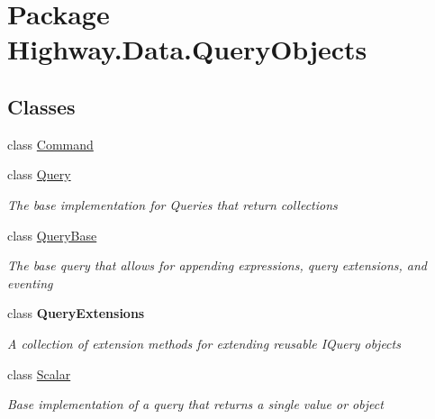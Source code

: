 \hypertarget{namespace_highway_1_1_data_1_1_query_objects}{\section{Package Highway.\-Data.\-Query\-Objects}
\label{namespace_highway_1_1_data_1_1_query_objects}
}
\subsection*{Classes}
\begin{DoxyCompactItemize}
\item 
class \hyperlink{class_highway_1_1_data_1_1_query_objects_1_1_command}{Command}
\begin{DoxyCompactList}\small\item\em \end{DoxyCompactList}\item 
class \hyperlink{class_highway_1_1_data_1_1_query_objects_1_1_query-g}{Query}
\begin{DoxyCompactList}\small\item\em The base implementation for Queries that return collections \end{DoxyCompactList}\item 
class \hyperlink{class_highway_1_1_data_1_1_query_objects_1_1_query_base}{Query\-Base}
\begin{DoxyCompactList}\small\item\em The base query that allows for appending expressions, query extensions, and eventing \end{DoxyCompactList}\item 
class {\bfseries Query\-Extensions}
\begin{DoxyCompactList}\small\item\em A collection of extension methods for extending reusable I\-Query objects \end{DoxyCompactList}\item 
class \hyperlink{class_highway_1_1_data_1_1_query_objects_1_1_scalar-g}{Scalar}
\begin{DoxyCompactList}\small\item\em Base implementation of a query that returns a single value or object \end{DoxyCompactList}\end{DoxyCompactItemize}
